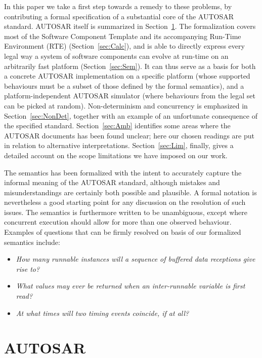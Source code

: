 \documentclass[10pt,conference]{IEEEtran}
\begin{document}
In this paper we take a first step towards a remedy to these problems, by contributing a formal specification of a substantial core of the AUTOSAR standard. AUTOSAR itself is summarized in Section~\ref{sec:autosar}. The formalization covers most of the Software Component Template and its accompanying Run-Time Environment (RTE) (Section~\ref{sec:Calc}), and is able to directly express every legal way a system of software components can evolve at run-time on an arbitrarily fast platform (Section~\ref{sec:Sem}). It can thus serve as a basis for both a concrete AUTOSAR implementation on a specific platform (whose supported behaviours must be a subset of those defined by the formal semantics), and a platform-independent AUTOSAR simulator (where behaviours from the legal set can be picked at random). 
Non-determinism and concurrency is emphasized in Section~\ref{sec:NonDet}, together with an example of an unfortunate consequence of the specified standard. Section~\ref{sec:Amb} identifies some areas where the AUTOSAR documents has been found unclear; here our chosen readings are put in relation to alternative interpretations. Section~\ref{sec:Lim}, finally, gives a detailed account on the scope limitations we have imposed on our work.

The semantics has been formalized with the intent to accurately capture the informal meaning of the AUTOSAR standard, although mistakes and misunderstandings are certainly both possible and plausible. A formal notation is nevertheless a good starting point for any discussion on the resolution of such issues. The semantics is furthermore written to be unambiguous, except where concurrent execution should allow for more than one observed behaviour. Examples of questions that can be firmly resolved on basis of our formalized semantics include:
\begin{itemize}
\item {\em How many runnable instances will a sequence of buffered data receptions give rise to?}
\item {\em What values may ever be returned when an inter-runnable variable is first read?}
\item {\em At what times will two timing events coincide, if at all?}
\end{itemize}


\section{AUTOSAR}
\label{sec:autosar}
\end{document}
